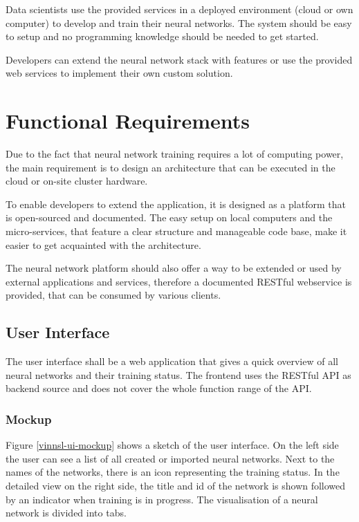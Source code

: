 Data scientists use the provided services in a deployed environment
(cloud or own computer) to develop and train their neural networks. The
system should be easy to setup and no programming knowledge should be
needed to get started.

Developers can extend the neural network stack with features or use the
provided web services to implement their own custom solution.

\section{Functional Requirements}\label{functional-requirements}

Due to the fact that neural network training requires a lot of computing
power, the main requirement is to design an architecture that can be
executed in the cloud or on-site cluster hardware.

To enable developers to extend the application, it is designed as a
platform that is open-sourced and documented. The easy setup on local
computers and the micro-services, that feature a clear structure and
manageable code base, make it easier to get acquainted with the
architecture.

The neural network platform should also offer a way to be extended or
used by external applications and services, therefore a documented
RESTful webservice is provided, that can be consumed by various clients.

\subsection{User Interface}\label{user-interface}

The user interface shall be a web application that gives a quick
overview of all neural networks and their training status. The frontend
uses the RESTful API as backend source and does not cover the whole
function range of the API.

\subsubsection{Mockup}\label{mockup}

Figure \ref{vinnsl-ui-mockup} shows a sketch of the user interface. On
the left side the user can see a list of all created or imported neural
networks. Next to the names of the networks, there is an icon
representing the training status. In the detailed view on the right
side, the title and id of the network is shown followed by an indicator
when training is in progress. The visualisation of a neural network is
divided into tabs.

